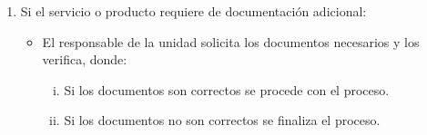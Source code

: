 \begin{enumerate}
    \item Si el servicio o producto requiere de documentación adicional:
          \begin{itemize}
              \item El responsable de la unidad solicita los documentos necesarios y los verifica, donde:
                    \begin{enumerate}[i.]
                        \item Si los documentos son correctos se procede con el proceso.
                        \item Si los documentos no son correctos se finaliza el proceso.
                    \end{enumerate}
          \end{itemize}
\end{enumerate}
